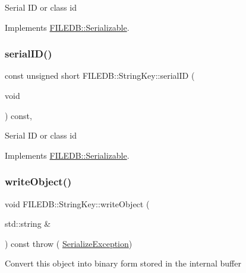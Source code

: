 Serial ID or class id 

Implements \mbox{\hyperlink{classFILEDB_1_1Serializable_a5d639b5dbd5d8ebc7dca1eca31bbc868}{F\+I\+L\+E\+D\+B\+::\+Serializable}}.

\mbox{\label{classFILEDB_1_1StringKey_ad139b5cab667be479edae524f436805a}} 
\subsubsection{\texorpdfstring{serialID()}{serialID()}\hspace{0.1cm}{\footnotesize\ttfamily [3/3]}}
{\footnotesize\ttfamily const unsigned short F\+I\+L\+E\+D\+B\+::\+String\+Key\+::serial\+ID (\begin{DoxyParamCaption}\item[{void}]{ }\end{DoxyParamCaption}) const\hspace{0.3cm}{\ttfamily [inline]}, {\ttfamily [virtual]}}

Serial ID or class id 

Implements \mbox{\hyperlink{classFILEDB_1_1Serializable_a5d639b5dbd5d8ebc7dca1eca31bbc868}{F\+I\+L\+E\+D\+B\+::\+Serializable}}.

\mbox{\label{classFILEDB_1_1StringKey_a29db7eea425c851c5e0a4336d7a85fb1}} 
\subsubsection{\texorpdfstring{writeObject()}{writeObject()}\hspace{0.1cm}{\footnotesize\ttfamily [1/3]}}
{\footnotesize\ttfamily void F\+I\+L\+E\+D\+B\+::\+String\+Key\+::write\+Object (\begin{DoxyParamCaption}\item[{std\+::string \&}]{ }\end{DoxyParamCaption}) const throw ( \mbox{\hyperlink{classFILEDB_1_1SerializeException}{Serialize\+Exception}}) \hspace{0.3cm}{\ttfamily [virtual]}}

Convert this object into binary form stored in the internal buffer 

